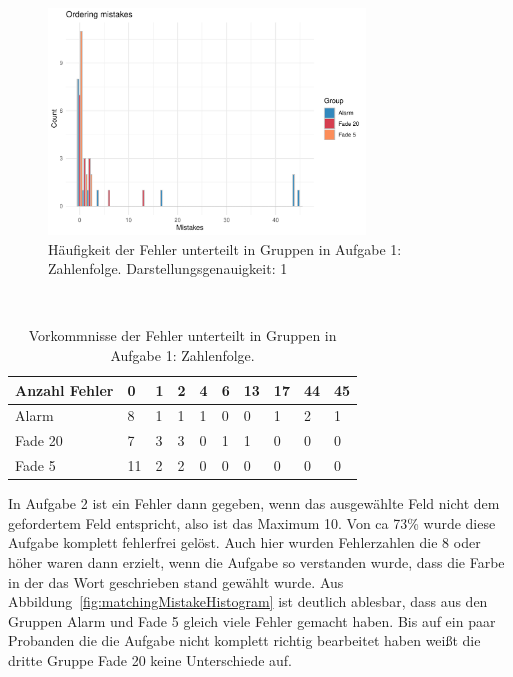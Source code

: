 \begin{figure}[H]
	\centering
	\includegraphics[width=0.75\textwidth]{./_StudyResults/orderingMisHist}
	\caption{Häufigkeit der Fehler unterteilt in Gruppen in Aufgabe 1: Zahlenfolge. Darstellungsgenauigkeit: 1}
	\label{fig:orderingMistakeHistogram}
\end{figure}

\begin{table}
	\caption{Vorkommnisse der Fehler unterteilt in Gruppen in Aufgabe 1: Zahlenfolge.}~\label{tab:orderingMistakeNumbers}
	
	\setlength\tabcolsep{3pt}
	\renewcommand{\arraystretch}{1.4}%
	\begin{tabularx}{\textwidth}{ | l | x | x | x | x | x | x | x | x | x | }
		\hline
		Anzahl Fehler & 0   & 1  & 2  & 4  & 6  & 13 & 17 & 44  & 45 \\ \hline\hline
		Alarm 	  & 8  & 1  & 1  & 1  & 0  & 0  & 1  &  2  & 1  \\ \hline
		Fade 20	  & 7  & 3  & 3  & 0  & 1  & 1  & 0  &  0  & 0  \\ \hline
		Fade 5	  & 11  & 2  & 2  & 0  & 0  & 0  & 0  &  0  & 0  \\ \hline
	\end{tabularx}
\end{table}

In Aufgabe 2 ist ein Fehler dann gegeben, wenn das ausgewählte Feld nicht dem gefordertem Feld entspricht, also ist das Maximum 10.
Von ca 73\% wurde diese Aufgabe komplett fehlerfrei gelöst.
Auch hier wurden Fehlerzahlen die 8 oder höher waren dann erzielt, wenn die Aufgabe so verstanden wurde, dass die Farbe in der das Wort geschrieben stand gewählt wurde.
Aus Abbildung~\ref{fig:matchingMistakeHistogram} ist deutlich ablesbar, dass aus den Gruppen Alarm und Fade 5 gleich viele Fehler gemacht haben. Bis auf ein paar Probanden die die Aufgabe nicht komplett richtig bearbeitet haben weißt die dritte Gruppe Fade 20 keine Unterschiede auf.

